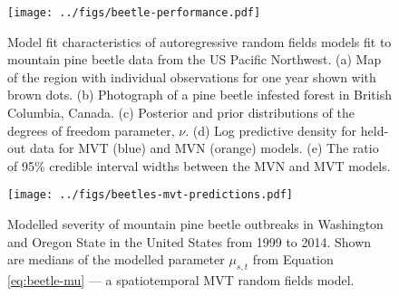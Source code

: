 \documentclass[12pt,english]{article}
\begin{document}
\begin{spacing}{1.9}
\begin{figure}[htb]
  \begin{center}
    \texttt{[image: ../figs/beetle-performance.pdf]}
    \caption{
      Model fit characteristics of autoregressive random fields
      models fit to mountain pine beetle data from the US Pacific Northwest.
      (a) Map of the region with individual observations for one year shown with
      brown dots.
      (b) Photograph of a pine beetle infested forest in British Columbia, Canada.
      (c) Posterior and prior distributions of the degrees of freedom parameter, $\nu$.
      (d) Log predictive density for held-out data for MVT (blue) and MVN (orange) models.
      (e) The ratio of 95\% credible interval widths between the MVN and MVT models.
    }
    \label{fig:map-etc}
  \end{center}
\end{figure}

\clearpage

\begin{figure}[htb]
  \begin{center}
    \texttt{[image: ../figs/beetles-mvt-predictions.pdf]}
    \caption{Modelled severity of mountain pine beetle outbreaks in Washington and
      Oregon State in the United States from 1999 to 2014.
      Shown are medians of the modelled parameter $\mu_{s,t}$ from Equation \ref{eq:beetle-mu}
      --- a spatiotemporal MVT random fields model.
    }
    \label{fig:beetle-pred}
  \end{center}
\end{figure}


\end{spacing}
\end{document}
